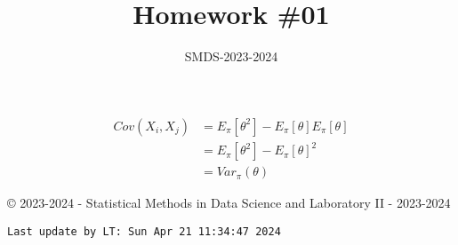 \documentclass[
]{article}
\title{Homework \#01}
\author{SMDS-2023-2024}
\date{\textsc{\textbf{\Large Statstical Methods in Data Science II a.y. 2022-2023}}\\
\strut \\
M.Sc. in Data Science\\
\strut \\
\underline{deadline: April 26th, 2024}}
\begin{document}
\maketitle

\[
\begin{split}
Cov(X_i,X_j) &= E_\pi[\theta^2] - E_\pi[\theta]E_\pi[\theta] \\
&= E_\pi[\theta^2] - E_\pi[\theta]^2 \\
&= Var_\pi(\theta)
\end{split}
\]

© 2023-2024 - Statistical Methods in Data Science and Laboratory II -
2023-2024

\begin{verbatim}
Last update by LT: Sun Apr 21 11:34:47 2024
\end{verbatim}
\end{document}
